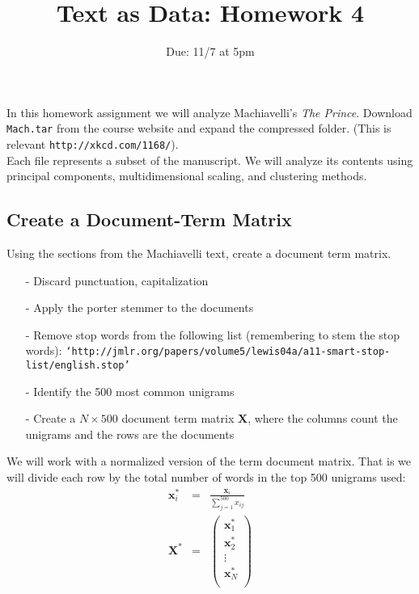 \documentclass[12pt,letterpaper]{article}
\title{Text as Data: Homework 4}
\date{Due: 11/7 at 5pm}
\begin{document}
\maketitle




In this homework assignment we will analyze Machiavelli's \emph{The Prince}.  Download {\tt Mach.tar} from the course website and expand the compressed folder.  (This is relevant {\tt http://xkcd.com/1168/}).  \\

Each file represents a subset of the manuscript.  We will analyze its contents using principal components, multidimensional scaling, and clustering methods. 



\subsection*{Create a Document-Term Matrix}

Using the sections from the Machiavelli text, create a document term matrix.
\begin{itemize}
\item[-] Discard punctuation, capitalization
\item[-] Apply the porter stemmer to the documents
\item[-] Remove stop words from the following list (remembering to stem the stop words):
{\tt `http://jmlr.org/papers/volume5/lewis04a/a11-smart-stop-list/english.stop'}
\item[-] Identify the 500 most common unigrams
\item[-] Create a $N \times 500$ document term matrix $\boldsymbol{X}$, where the columns count the unigrams and the rows are the documents
\end{itemize}


We will work with a normalized version of the term document matrix.  That is we will divide each row by the total number of words in the top 500 unigrams used:
\begin{eqnarray}
\boldsymbol{x}_{i}^{*} & = & \frac{\boldsymbol{x}_{i}}{\sum_{j=1}^{500} x_{ij}} \nonumber\\
\boldsymbol{X}^{*} & = & \begin{pmatrix} \boldsymbol{x}_{1}^{*} \\
\boldsymbol{x}_{2}^{*} \\
\vdots \\
\boldsymbol{x}_{N}^{*} \\
  \end{pmatrix}  \nonumber 
\end{eqnarray}
\end{document}
